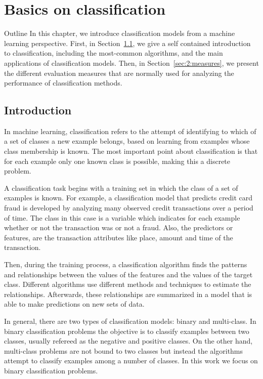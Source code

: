 \chapter{Basics on classification}\label{ch:2}

\begin{remark}{Outline}
In this chapter, we introduce classification models from a machine learning perspective. 
First, in Section~\ref{sec:2:classification}, we give a self contained introduction to 
classification, including the most-common algorithms, and the main applications of 
classification models. Then, in Section~\ref{sec:2:measures}, we present the different evaluation 
measures that are normally used for analyzing the performance of classification methods.
\end{remark}

\section{Introduction}
\label{sec:2:classification}

In machine learning, classification refers to the attempt of identifying to which of a set of 
classes a new example belongs, based on learning from examples whose class membership is known. 
The most important point about classification is that for each example only one known class is 
possible, making this a discrete problem. 

A classification task begins with a training set in which the class of a set of examples is known. 
For example, a classification model that predicts credit card fraud is developed by analyzing 
many observed credit transactions over a period of time. The class in this case is a variable which 
indicates for each example whether or not the transaction was or not a fraud. Also, the predictors 
or features, are the transaction attributes like place, amount and time of the transaction.

Then, during the training process, a classification algorithm finds the patterns and relationships 
between the values of the features and the values of the target class. Different algorithms use 
different methods and techniques to estimate the relationships. Afterwards, these relationships are 
summarized in a model that is able to make predictions on new sets of data.

In general, there are two types of classification models: binary and multi-class. In binary 
classification problems the objective is to classify examples between two classes, usually refereed 
as the negative and positive classes. On the other hand, multi-class problems are not bound to two 
classes but instead the algorithms attempt to classify examples among a number of classes. In this 
work we focus on binary classification problems.

